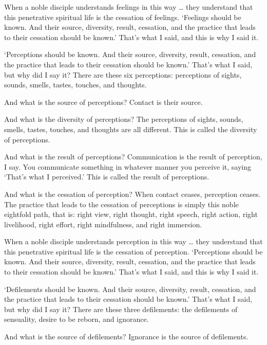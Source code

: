 \documentclass[12pt,openany]{book}%
\begin{document}
When a noble disciple understands feelings in this way … they understand that this penetrative spiritual life is the cessation of feelings. ‘Feelings should be known. And their source, diversity, result, cessation, and the practice that leads to their cessation should be known.’ That’s what I said, and this is why I said it. 

‘Perceptions should be known. And their source, diversity, result, cessation, and the practice that leads to their cessation should be known.’ That’s what I said, but why did I say it? There are these six perceptions: perceptions of sights, sounds, smells, tastes, touches, and thoughts. 

And what is the source of perceptions? Contact is their source. 

And what is the diversity of perceptions? The perceptions of sights, sounds, smells, tastes, touches, and thoughts are all different. This is called the diversity of perceptions. 

And what is the result of perceptions? Communication is the result of perception, I say. You communicate something in whatever manner you perceive it, saying ‘That’s what I perceived.’ This is called the result of perceptions. 

And what is the cessation of perception? When contact ceases, perception ceases. The practice that leads to the cessation of perceptions is simply this noble eightfold path, that is: right view, right thought, right speech, right action, right livelihood, right effort, right mindfulness, and right immersion. 

When a noble disciple understands perception in this way … they understand that this penetrative spiritual life is the cessation of perception. ‘Perceptions should be known. And their source, diversity, result, cessation, and the practice that leads to their cessation should be known.’ That’s what I said, and this is why I said it. 

‘Defilements should be known. And their source, diversity, result, cessation, and the practice that leads to their cessation should be known.’ That’s what I said, but why did I say it? There are these three defilements: the defilements of sensuality, desire to be reborn, and ignorance. 

And what is the source of defilements? Ignorance is the source of defilements. 
\end{document}
